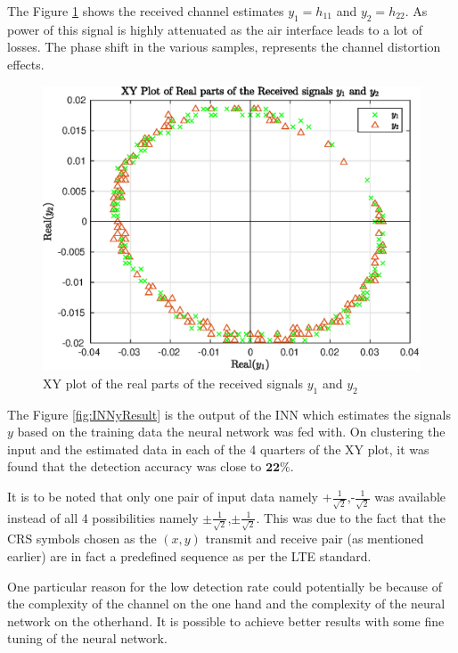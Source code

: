 The Figure \ref{fig:INNyn} shows the received channel estimates $y_1 = h_{11}$ and $y_2 = h_{22}$. As power of this signal is highly attenuated as the air interface leads to a lot of losses. The phase shift in the various samples, represents the channel distortion effects.

\begin{figure}[H]
    \centering
    \includegraphics[width=\linewidth]{images/INNyn.eps}
    \caption{XY plot of the real parts of the received signals $y_1$ and $y_2$}
    \label{fig:INNyn}
\end{figure}

The Figure \ref{fig:INNyResult} is the output of the INN which estimates the signals $y$ based on the training data the neural network was fed with. On clustering the input and the estimated data in each of the 4 quarters of the XY plot, it was found that the detection accuracy was close to $\textbf{22}\%$.

It is to be noted that only one pair of input data namely +$\frac{1}{\sqrt{2}}$,-$\frac{1}{\sqrt{2}}$ was available instead of all 4 possibilities namely $\pm \frac{1}{\sqrt{2}}$,$\pm \frac{1}{\sqrt{2}}$. This was due to the fact that the CRS symbols chosen as the $(x,y)$ transmit and receive pair (as mentioned earlier) are in fact a predefined sequence as per the LTE standard.

One particular reason for the low detection rate could potentially be because of the complexity of the channel on the one hand and the complexity of the neural network on the otherhand. It is possible to achieve better results with some fine tuning of the neural network.

